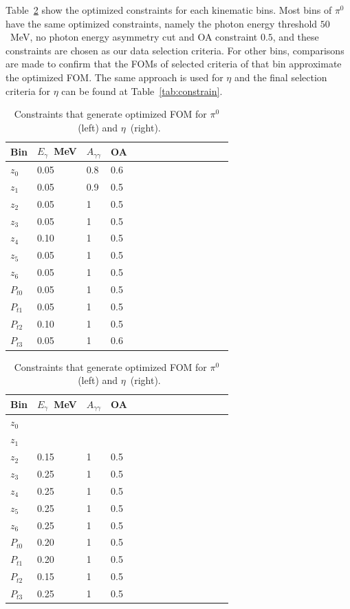 Table~\ref{tab:FOM} show the optimized constraints for each kinematic bins. Most bins of $\pi^0$ have the same optimized constraints, namely the photon energy threshold $50$~MeV, no photon energy asymmetry cut and OA constraint $0.5$, and these constraints are chosen as our data selection criteria. For other bins, comparisons are made to confirm that the FOMs of selected criteria of that bin approximate the optimized FOM. The same approach is used for $\eta$ and the final selection criteria for $\eta$ can be found at Table~\ref{tab:constrain}.%
\begin{table}[H]
\begin{tabular}{|p{1.3cm}|l|l|l|l|l|l|l|l|l|l|l|l|l|}
\hline
Bin & $E_{\gamma}$~MeV & $A_{\gamma\gamma}$ & OA \\ \hline
$z_0$ & 0.05 & 0.8 & 0.6 \\\hline
$z_1$ & 0.05 & 0.9 & 0.5 \\\hline
$z_2$ & 0.05 & 1 & 0.5 \\\hline
$z_3$ & 0.05 & 1 & 0.5 \\\hline
$z_4$ & 0.10 & 1 & 0.5 \\\hline
$z_5$ & 0.05 & 1 & 0.5 \\\hline
$z_6$ & 0.05 & 1 & 0.5 \\\hline
$P_{t0}$ & 0.05 & 1 & 0.5 \\\hline
$P_{t1}$ & 0.05 & 1 & 0.5 \\\hline
$P_{t2}$ & 0.10 & 1 & 0.5 \\\hline
$P_{t3}$ & 0.05 & 1 & 0.6 \\\hline
\end{tabular}
\quad
\begin{tabular}{|p{1.3cm}|l|l|l|l|l|l|l|l|l|l|l|l|l|}
\hline
Bin & $E_{\gamma}$~MeV & $A_{\gamma\gamma}$ & OA \\ \hline
$z_0$ &  &  &  \\\hline
$z_1$ &  &  &  \\\hline
$z_2$ & 0.15 & 1 & 0.5 \\\hline
$z_3$ & 0.25 & 1 & 0.5 \\\hline
$z_4$ & 0.25 & 1 & 0.5 \\\hline
$z_5$ & 0.25 & 1 & 0.5 \\\hline
$z_6$ & 0.25 & 1 & 0.5 \\\hline
$P_{t0}$ & 0.20 & 1 & 0.5 \\\hline
$P_{t1}$ & 0.20 & 1 & 0.5 \\\hline
$P_{t2}$ & 0.15 & 1 & 0.5 \\\hline
$P_{t3}$ & 0.25 & 1 & 0.5 \\\hline
\end{tabular}
\caption{Constraints that generate optimized FOM for $\pi^0$~(left) and $\eta$~(right).}
\label{tab:FOM}
\end{table}

